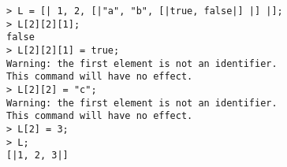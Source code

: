 \begin{center}\begin{minipage}{15cm}\begin{Verbatim}[frame=single]
> L = [| 1, 2, [|"a", "b", [|true, false|] |] |];
> L[2][2][1];
false
> L[2][2][1] = true;
Warning: the first element is not an identifier.
This command will have no effect.
> L[2][2] = "c";
Warning: the first element is not an identifier.
This command will have no effect.
> L[2] = 3;
> L;
[|1, 2, 3|]
\end{Verbatim}
\end{minipage}\end{center}
